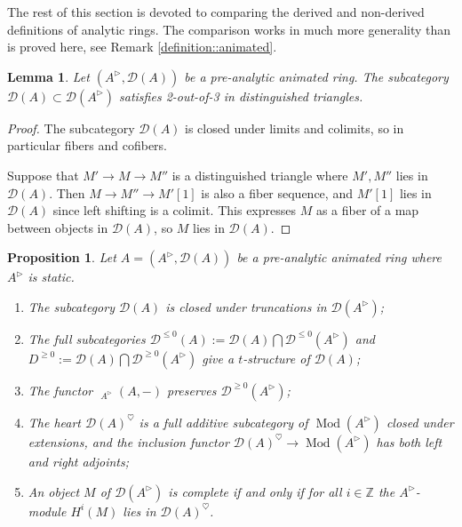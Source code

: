 \documentclass{article}
\theoremstyle{plain}
\newtheorem{prop}[thm]{Proposition}
\newtheorem{lem}[thm]{Lemma}
\theoremstyle{definition}
\theoremstyle{remark}
\DeclareMathOperator{\Homs}{\underline{Hom}}
\DeclareMathOperator{\modcat}{Mod}
\newcommand{\huflag}{\triangleright}
\newcommand{\D}{\mathcal{D}}
\newcommand{\heart}{\heartsuit}
\begin{document}
The rest of this section is devoted to comparing the derived and non-derived definitions of analytic rings.
The comparison works in much more generality than is proved here, see Remark \ref{definition::animated}.

\begin{lem}
Let $ (A ^{\huflag}, \D (A)) $ be a pre-analytic animated ring.
The subcategory $ \D (A)\subset \D (A ^{\huflag}) $ satisfies 2-out-of-3 in distinguished triangles.
\end{lem}

\begin{proof}
The subcategory $ \D (A) $ is closed under limits and colimits, so in particular fibers and cofibers.

Suppose that $ M'\to M\to M'' $ is a distinguished triangle where $ M',M'' $ lies in $ \D (A) $.
Then $ M\to M''\to M'[1] $ is also a fiber sequence, and $ M' [1] $ lies in $ \D (A) $ since left shifting is a colimit.
This expresses $ M $ as a fiber of a map between objects in $ \D (A) $, so $ M $ lies in $ \D (A) $.
\end{proof}

\begin{prop}
Let $ A = (A ^{\huflag}, \D (A)) $ be a pre-analytic animated ring where $ A ^{\huflag} $ is static.
\begin{enumerate}
\item The subcategory $ \D (A) $ is closed under truncations in $ \D (A ^{\huflag}) $;
\item The full subcategories $ \D ^{\leq 0}(A) := \D (A) \bigcap \D ^{\leq 0}(A ^{\huflag}) $ and $ D ^{\geq 0} := \D (A) \bigcap \D ^{\geq 0} (A ^{\huflag}) $
give a $ t $-structure of $ \D (A) $;
\item The functor $ \Homs _{A ^{\huflag}}(A, -) $ preserves $ \D ^{\geq 0}(A ^{\huflag}) $;
\item The heart $ \D (A)^{\heart} $ is a full additive subcategory of $ \modcat (A ^{\huflag}) $ closed under extensions,
and the inclusion functor $ \D (A)^{\heart}\to \modcat (A ^{\huflag}) $ has both left and right adjoints;
\item An object $ M $ of $ \D (A ^{\huflag}) $ is complete if and only if for all $ i\in \mathbb{Z} $ the $ A ^{\huflag} $-module
$ H ^{i}(M) $ lies in $ \D (A)^{\heart} $.
\end{enumerate}
\label{definition::tstr}
\end{prop}
\end{document}
